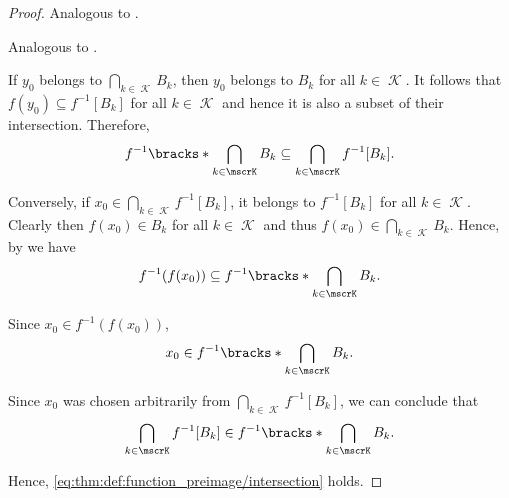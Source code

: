\begin{proof}
   Analogous to .

   Analogous to .

   If \( y_0 \) belongs to \( \bigcap_{k \in \mscrK} B_k \), then \( y_0 \) belongs to \( B_k \) for all \( k \in \mscrK \). It follows that \( f(y_0) \subseteq f^{-1}[B_k] \) for all \( k \in \mscrK \) and hence it is also a subset of their intersection. Therefore,
  \begin{equation*}
    f^{-1} \bracks*{ \bigcap_{k \in \mscrK} B_k } \subseteq \bigcap_{k \in \mscrK} f^{-1}[B_k].
  \end{equation*}

  Conversely, if \( x_0 \in \bigcap_{k \in \mscrK} f^{-1}[B_k] \), it belongs to \( f^{-1}[B_k] \) for all \( k \in \mscrK \). Clearly then \( f(x_0) \in B_k \) for all \( k \in \mscrK \) and thus \( f(x_0) \in \bigcap_{k \in \mscrK} B_k \). Hence, by  we have
  \begin{equation*}
    f^{-1}(f(x_0))
    \subseteq
    f^{-1}\bracks*{ \bigcap_{k \in \mscrK} B_k }.
  \end{equation*}

  Since \( x_0 \in f^{-1}(f(x_0)) \),
  \begin{equation*}
    x_0 \in f^{-1}\bracks*{ \bigcap_{k \in \mscrK} B_k }.
  \end{equation*}

  Since \( x_0 \) was chosen arbitrarily from \( \bigcap_{k \in \mscrK} f^{-1}[B_k] \), we can conclude that
  \begin{equation*}
    \bigcap_{k \in \mscrK} f^{-1}[B_k] \in f^{-1}\bracks*{ \bigcap_{k \in \mscrK} B_k }.
  \end{equation*}

  Hence, \eqref{eq:thm:def:function_preimage/intersection} holds.


\end{proof}

